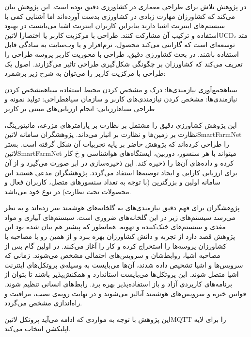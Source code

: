 
در پژوهش  تلاش برای طراحی معماری در کشاورزی دقیق بوده است. این پژوهش بیان می‌کند که کشاورزان مهارت زیادی در کشاورزی بدست آورده‌اند اما آشنایی کمی با سیستم‌های اینترنت اشیا دارند
بنابراین کاربران اینترنت اشیا می‌بایست در بهبود استفاده و ترکیب آن مشارکت کنند. طراحی با مرکزیت کاربر یا اختصارا ‌لاتین{UCD}، متد توسعه‌ای است که گارانتی می‌کند محصول، نرم‌افزار و یا وب‌سایت به سادگی قابل استفاده باشند.
در بحث کشاورزی دقیق، طراحی با محوریت کاربر پروسه طراحی را تعریف می‌کند که کشاورزان بر چگونگی شکل‌گیری طراحی تاثیر می‌گزارند. اصول یک طراحی با مرکزیت کاربر را می‌توان به شرح زیر برشمرد:

 ‌سیاه{جمع‌آوری نیازمندی‌ها}: درک و مشخص کردن محیط استفاده
 ‌سیاه{مشخص کردن نیازمندی‌ها}: مشخص کردن نیازمندی‌های کاربر و سازمان
 ‌سیاه{طراحی}: تولید نمونه و طراحی
 ‌سیاه{ارزیابی}: انجام ارزیابی‌های مبتنی بر کاربر

این پژوهش کشاورزی دقیق را مشتمل بر نظارت بر پارامترهای مزرعه، مانیتورینگ، نظارت بر زمین‌ها و نظارت بر انبار می‌داند. پژوهشگران سامانه ‌لاتین{SmartFarmNet} را طراحی کرده‌اند که پژوهش حاضر بر پایه تجربیات آن شکل گرفته است.
بستر ‌لاتین{SmartFarmNet} میتواند با هر سنسور، دوربین، ایستگاه‌های هواشناسی و ‌خ کار کرده و داده‌های آن‌ها را ذخیره کند. این ذخیره‌سازی در ابر صورت می‌گیرد و از آن برای ارزیابی کارایی و ایجاد توصیه‌ها استفاد می‌گردد.
پژوهشگران مدعی هستند این سامانه اولین و بزرگترین (با توجه به تعداد سنسورهای متصل، کاربران فعال و محصولات تحت نظارت) در نوع خود می‌باشد.

پژوهشگران برای فهم دقیق نیازمندی‌های به گلخانه‌های هوشمند سر زده‌اند و به نظر می‌رسد سیستم‌های زیر در این گلخانه‌های ضروری است. سیستم‌های آبیاری و مواد مغذی و سیستم‌های خنک‌کننده و تهویه.
همانطور که پیشتر هم بیان شده بود این پژوهش قصد دارد از تجربه و دانش کشاورزان بهره ببرد و از همین رو با مصاحبه با کشاورزان پروسه‌ها را استخراج کرده و کار را آغاز می‌کنند.
در اولین گام پس از مصاحبه اشیا، روابط‌شان و سرویس‌های احتمالی مشخص می‌شوند. زمانی که سرویس‌ها و اشیا تشخیص داده شدند، آن‌ها می‌بایست به وسیله‌ی پروتکل‌های اینترنت اشیا متصل شوند.
این پروتکل‌ها می‌بایست استاندارد و همکنش‌پذیر باشند تا بتوان از برنامه‌های کاربردی آزاد و باز استفاده‌پذیر بهره برد.
رابط‌های انسانی تنظیم شوند.
قوانین خبره و سرویس‌های هوشمند آنالیز می‌شوند و در نهایت رویه‌ی نصب، مراقبت و راه‌اندازی مشخص می‌گردد.

این پژوهش با توجه به مواردی که ادامه می‌آید پروتکل ‌لاتین{MQTT} را برای لایه اپلیکشن انتخاب می‌کند.

